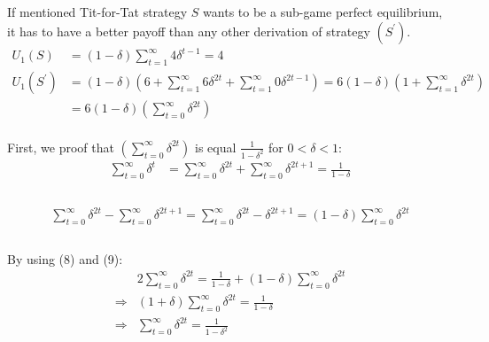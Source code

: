 \documentclass[
  course = {{IE579 Game Theory and Multi-Agent Reinforcement Learning}},
  quartile = {{4}},
  assignment = 2,
  name = {{Mohammad Mahdi Rahimi}},
  studentnumber = {{20208244}},
  email = {{mahi@kaist.ac.kr}},
  firstexercise = 1
]{aga-homework}
\begin{document}
\subexercise
\\\\
If mentioned Tit-for-Tat strategy $S$ wants to be a sub-game perfect equilibrium, it has to have a better payoff than any other derivation of strategy $(S^\prime)$.
\begin{equation} \label{eq1}
\begin{split}
U_1(S) & = (1 - \delta)\sum^\infty_{t = 1}{4\delta^{t - 1}} = 4\\
U_1(S^\prime) & = (1 - \delta)(6 + \sum^{\infty}_{t = 1}{6\delta^{2t}} + \sum^\infty_{t=1}{0 \delta^{2t-1}}) = 6(1 - \delta)(1 + \sum^{\infty}_{t = 1}{\delta^{2t}}) \\
& = 6(1 - \delta)(\sum^{\infty}_{t = 0}{\delta^{2t}})
\end{split}
\end{equation}\\
First, we proof that $(\sum^{\infty}_{t = 0}{\delta^{2t}})$ is equal $\frac{1}{1 - \delta^2}$ for $0 < \delta < 1$:
\begin{equation} \label{eq1}
\begin{split}
\sum^{\infty}_{t = 0}{\delta^{t}} & = \sum^{\infty}_{t = 0}{\delta^{2t}} + \sum^{\infty}_{t = 0}{\delta^{2t+1}} = \frac{1}{1 - \delta}\\
\end{split}
\end{equation}\\
\begin{equation} \label{eq1}
\begin{split}
\sum^{\infty}_{t = 0}{\delta^{2t}} - \sum^{\infty}_{t = 0}{\delta^{2t+1}} = \sum^{\infty}_{t = 0}{\delta^{2t} - \delta^{2t+1}} = (1 - \delta)\sum^{\infty}_{t = 0}{\delta^{2t}}\\
\end{split}
\end{equation}\\
By using (8) and (9):\\
\begin{equation} \label{eq1}
\begin{split}
& 2\sum^{\infty}_{t = 0}{\delta^{2t}} = \frac{1}{1 - \delta} + (1 - \delta)\sum^{\infty}_{t = 0}{\delta^{2t}}\\
\Rightarrow & (1 + \delta)\sum^{\infty}_{t = 0}{\delta^{2t}} = \frac{1}{1 - \delta}\\
\Rightarrow & \sum^{\infty}_{t = 0}{\delta^{2t}} = \frac{1}{1 - \delta^2}\\
\end{split}
\end{equation}\\
\end{document}
